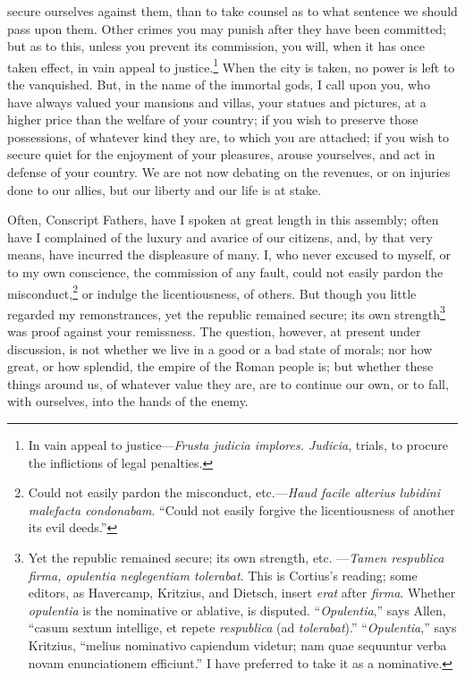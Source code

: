 secure ourselves against them, than to take counsel as to what
sentence we should pass upon them. Other crimes you may punish after
they have been committed; but as to this, unless you prevent its
commission, you will, when it has once taken effect, in vain appeal to
justice.\footnote{In vain appeal to justice—\emph{Frusta judicia implores. Judicia},
trials, to procure the inflictions of legal penalties.} When the city is taken, no power is left to the
vanquished. But, in the name of the immortal gods, I call upon you,
who have always valued your mansions and villas, your statues and
pictures, at a higher price than the welfare of your country; if you
wish to preserve those possessions, of whatever kind they are, to
which you are attached; if you wish to secure quiet for the enjoyment
of your pleasures, arouse yourselves, and act in defense of your
country. We are not now debating on the revenues, or on injuries done
to our allies, but our liberty and our life is at stake.

Often, Conscript Fathers, have I spoken at great length in this
assembly; often have I complained of the luxury and avarice of our
citizens, and, by that very means, have incurred the displeasure of
many. I, who never excused to myself, or to my own conscience, the
commission of any fault, could not easily pardon the misconduct,\footnote{Could not easily pardon the misconduct, etc.—\emph{Haud facile
alterius lubidini malefacta condonabam}. ``Could not easily forgive the
licentiousness of another its evil deeds.''}
or indulge the licentiousness, of others. But though you little
regarded my remonstrances, yet the republic remained secure; its own
strength\footnote{Yet the republic remained secure; its own strength, etc.
—\emph{Tamen respublica firma, opulentia neglegentiam tolerabat}. This is
Cortius's reading; some editors, as Havercamp, Kritzius, and Dietsch,
insert \emph{erat} after \emph{firma}. Whether \emph{opulentia} is the nominative or
ablative, is disputed. ``\emph{Opulentia},'' says Allen, ``casum sextum
intellige, et repete \emph{respublica} (ad \emph{tolerabat}).'' ``\emph{Opulentia},''
says Kritzius, ``melius nominativo capiendum videtur; nam quae
sequuntur verba novam enunciationem efficiunt.'' I have preferred to
take it as a nominative.} was proof against your remissness. The question, however,
at present under discussion, is not whether we live in a good or a bad
state of morals; nor how great, or how splendid, the empire of the
Roman people is; but whether these things around us, of whatever value
they are, are to continue our own, or to fall, with ourselves, into the
hands of the enemy.

